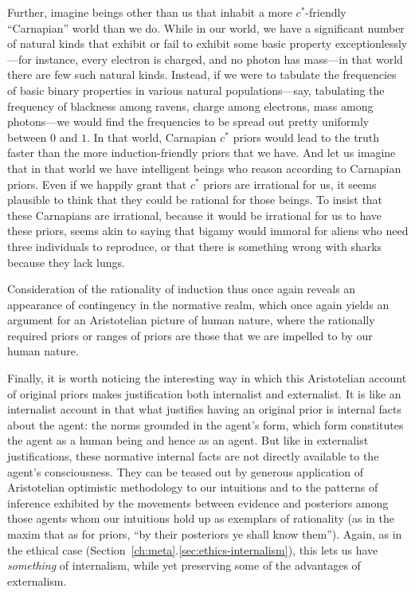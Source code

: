 Further, imagine beings other than us that inhabit a more $c^*$-friendly ``Carnapian'' world than we do. While in our world, we have a significant number of natural kinds
that exhibit or fail to exhibit some basic property exceptionlessly---for instance, every electron is charged, and no photon 
has mass---in that world there are few such natural kinds. Instead, if we were to tabulate the frequencies of basic binary properties
in various natural populations---say, tabulating the frequency of blackness among ravens, charge among electrons, mass among photons---we 
would find the frequencies to be spread out pretty uniformly between $0$ and $1$. In that world, Carnapian $c^*$ priors would lead to the truth faster
than the more induction-friendly priors that we have. And let us imagine that in that world we have intelligent beings who reason according
to Carnapian priors. Even if we happily grant that $c^*$ priors are irrational for us, it seems plausible to think that they could be
rational for those beings. To insist that these Carnapians are irrational, because it would be irrational for us to have these priors,
seems akin to saying that bigamy would immoral for aliens who need three individuals to reproduce, or that there is something wrong with sharks
because they lack lungs. 

Consideration of the rationality of induction thus once again reveals an appearance of contingency in the normative realm, which
once again yields an argument for an Aristotelian picture of human nature, where the rationally required priors or ranges of priors
are those that we are impelled to by our human nature.

Finally, it is worth noticing the interesting way in which this Aristotelian account of original priors makes 
justification both internalist and externalist. It is like an internalist account in that what justifies having 
an original prior is internal facts about the agent: the norms grounded in the agent's form, which form
constitutes the agent as a human being and hence as an agent. But like in externalist justifications, these normative
internal facts are not directly available to the agent's consciousness. They can be teased out by generous application of
Aristotelian optimistic methodology to our intuitions and to the patterns of inference exhibited by the movements 
between evidence and posteriors among those agents whom our intuitions hold up as exemplars of rationality
(as in the maxim that as for priors, ``by their posteriors ye shall know them''). Again, as in the ethical 
case (Section~\ref{ch:meta}.\ref{sec:ethics-internalism}),
this lets us have \textit{something} of internalism, while yet preserving some of the advantages of externalism.

